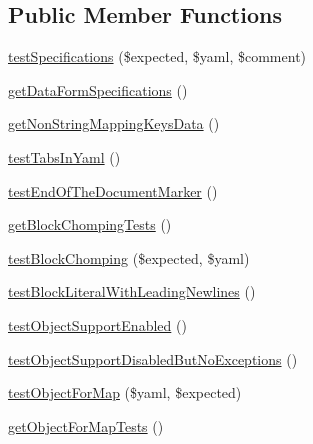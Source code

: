 \subsection*{Public Member Functions}
\begin{DoxyCompactItemize}
\item 
\mbox{\hyperlink{class_symfony_1_1_component_1_1_yaml_1_1_tests_1_1_parser_test_a6a8eabffd7507c3e88631dd8257ae62c}{test\+Specifications}} (\$expected, \$yaml, \$comment)
\item 
\mbox{\hyperlink{class_symfony_1_1_component_1_1_yaml_1_1_tests_1_1_parser_test_a4d2c7a09032d19aaa8ae922062bfcf31}{get\+Data\+Form\+Specifications}} ()
\item 
\mbox{\hyperlink{class_symfony_1_1_component_1_1_yaml_1_1_tests_1_1_parser_test_a0d436927f154d552f3802f39d15e2e3a}{get\+Non\+String\+Mapping\+Keys\+Data}} ()
\item 
\mbox{\hyperlink{class_symfony_1_1_component_1_1_yaml_1_1_tests_1_1_parser_test_a0a8d9b3a7750f06b50acfc607ba24aa7}{test\+Tabs\+In\+Yaml}} ()
\item 
\mbox{\hyperlink{class_symfony_1_1_component_1_1_yaml_1_1_tests_1_1_parser_test_a9c759c68f80e4ccbc7e192909bb3b2e3}{test\+End\+Of\+The\+Document\+Marker}} ()
\item 
\mbox{\hyperlink{class_symfony_1_1_component_1_1_yaml_1_1_tests_1_1_parser_test_a5695b539cda3500e55d66dd83ed37ba4}{get\+Block\+Chomping\+Tests}} ()
\item 
\mbox{\hyperlink{class_symfony_1_1_component_1_1_yaml_1_1_tests_1_1_parser_test_a24ac2a444d8a5ad237cab8b0d1fa961c}{test\+Block\+Chomping}} (\$expected, \$yaml)
\item 
\mbox{\hyperlink{class_symfony_1_1_component_1_1_yaml_1_1_tests_1_1_parser_test_af1742ce6c9b9eeeac3168831dbfd6436}{test\+Block\+Literal\+With\+Leading\+Newlines}} ()
\item 
\mbox{\hyperlink{class_symfony_1_1_component_1_1_yaml_1_1_tests_1_1_parser_test_a57928b695e7198894d7d584c32715a9e}{test\+Object\+Support\+Enabled}} ()
\item 
\mbox{\hyperlink{class_symfony_1_1_component_1_1_yaml_1_1_tests_1_1_parser_test_af91b4bceeb3a35225c1b4c44c7638375}{test\+Object\+Support\+Disabled\+But\+No\+Exceptions}} ()
\item 
\mbox{\hyperlink{class_symfony_1_1_component_1_1_yaml_1_1_tests_1_1_parser_test_a486b9ca01c9b2609ea21e8fcc3581eec}{test\+Object\+For\+Map}} (\$yaml, \$expected)
\item 
\mbox{\hyperlink{class_symfony_1_1_component_1_1_yaml_1_1_tests_1_1_parser_test_a50c790e363a6b30b63c96ea5dbe40410}{get\+Object\+For\+Map\+Tests}} ()

\end{DoxyCompactItemize}

